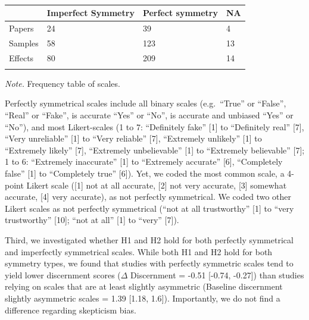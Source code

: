 \documentclass[
  doc,floatsintext]{apa6}
\begin{document}
\begin{table}[tbp]

\begin{center}
\begin{threeparttable}

\caption{\label{tab:n-symmetry}}

\begin{tabular}{llll}
\toprule
 & \multicolumn{1}{c}{Imperfect Symmetry} & \multicolumn{1}{c}{Perfect symmetry} & \multicolumn{1}{c}{NA}\\
\midrule
Papers & 24 & 39 & 4\\
Samples & 58 & 123 & 13\\
Effects & 80 & 209 & 14\\
\bottomrule
\addlinespace
\end{tabular}

\begin{tablenotes}[para]
\normalsize{\textit{Note.} Frequency table of scales.}
\end{tablenotes}

\end{threeparttable}
\end{center}

\end{table}

Perfectly symmetrical scales include all binary scales (e.g.~``True'' or ``False'', ``Real'' or ``Fake'', is accurate ``Yes'' or ``No'', is accurate and unbiased ``Yes'' or ``No''), and most Likert-scales (1 to 7: ``Definitely fake'' {[}1{]} to ``Definitely real'' {[}7{]}, ``Very unreliable'' {[}1{]} to ``Very reliable'' {[}7{]}, ``Extremely unlikely'' {[}1{]} to ``Extremely likely'' {[}7{]}, ``Extremely unbelievable'' {[}1{]} to ``Extremely believable'' {[}7{]}; 1 to 6: ``Extremely inaccurate'' {[}1{]} to ``Extremely accurate'' {[}6{]}, ``Completely false'' {[}1{]} to ``Completely true'' {[}6{]}). Yet, we coded the most common scale, a 4-point Likert scale ({[}1{]} not at all accurate, {[}2{]} not very accurate, {[}3{]} somewhat accurate, {[}4{]} very accurate), as not perfectly symmetrical. We coded two other Likert scales as not perfectly symmetrical (``not at all trustworthy'' {[}1{]} to ``very trustworthy'' {[}10{]}; ``not at all'' {[}1{]} to ``very'' {[}7{]}).

Third, we investigated whether H1 and H2 hold for both perfectly symmetrical and imperfectly symmetrical scales. While both H1 and H2 hold for both symmetry types, we found that studies with perfectly symmetric scales tend to yield lower discernment scores (\(\Delta\) Discernment = -0.51 {[}-0.74, -0.27{]}) than studies relying on scales that are at least slightly asymmetric (Baseline discernment slightly asymmetric scales = 1.39 {[}1.18, 1.6{]}). Importantly, we do not find a difference regarding skepticism bias.
\end{document}

